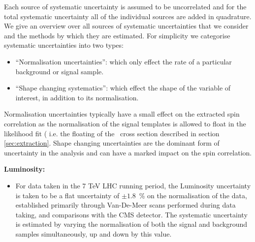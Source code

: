 
Each source of systematic uncertainty is assumed to be uncorrelated and for the total systematic uncertainty all of the individual sources are added in quadrature. We give an overview over all sources of systematic uncertainties that we consider and the methods by which they are estimated. For simplicity we categorise systematic uncertainties into two types: 
\begin{itemize}
	\item ``Normalisation uncertainties'': which only effect the rate of a particular background or signal sample.
	\item ``Shape changing systematics'': which effect the shape of the variable of interest, in addition to its normalisation. 
\end{itemize}
Normalisation uncertainties typically have a small effect on the extracted spin correlation as the normalisation of the signal templates is allowed to float in the likelihood fit ( i.e. the floating of the \ttbar\ cross section described in section \ref{sec:extraction}. Shape changing uncertainties are the dominant form of uncertainty in the analysis and can have a marked impact on the spin correlation.

\vspace{5mm}
\noindent
\textbf{Luminosity:}
\begin{itemize} 
     \item For data taken in the 7 TeV LHC running period, the Luminosity uncertainty is taken to be a flat uncertainty of $\pm1.8$~\% on the normalisation of the data, established primarily through Van-De-Meer scans performed during data taking, and comparisons with the CMS detector. The systematic uncertainty is estimated by varying the normalisation of both the signal and background samples simultaneously, up and down by this value.
\end{itemize}

